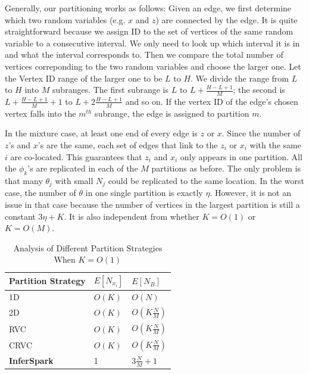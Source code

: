 Generally, our partitioning works as follows: Given an edge, we first determine
which two random variables (e.g. $x$ and $z$) are connected by the edge. It is
quite straightforward because we assign ID to the set of vertices of the same
random variable to a consecutive interval. We only need to look up which
interval it is in and what the interval corresponds to. Then we compare the
total number of vertices correponding to the two random variables and choose
the larger one. Let the Vertex ID range of the larger one to be $L$ to $H$. We
divide the range from $L$ to $H$ into $M$ subranges. The first subrange is $L$
to $L + \frac{H-L+1}{M}$; the second is $L + \frac{H-L+1}{M} + 1$ to $L +
2\frac{H-L+1}{M}$ and so on. If the vertex ID of the edge's chosen vertex falls
into the $m^{th}$ subrange, the edge is assigned to partition $m$.

In the mixture case, at least one end of every edge is $z$ or $x$. Since
the number of $z$'s and $x$'s are the same, 
each set of edges that link to the $z_i$ or $x_i$ with 
the same $i$ are co-located. This guarantees that $z_i$
and $x_i$ only appears in one partition. All the $\phi_k$'s are replicated in each
of the $M$ partitions as before. The only problem is that many $\theta_j$ with
small $N_j$ could be replicated to the same location. In the worst case, the
number of $\theta$ in one single partition is exactly $\eta$. However, it is
not an issue in that case because the number of vertices in the largest
partition is still a constant $3\eta + K$. It is also independent from whether $K
= O(1)$ or $K = O(M)$.


\begin{table}[h]
	\centering
	\caption{Analysis of Different Partition Strategies When $K = O(1)$}
	\label{tab:max_v_per_edge_part_O1}
	\small
	\begin{tabular}{lll}
		\hline
		Partition Strategy & $E[N_{x_i}]$ & $E[N_B]$\\\hline\hline
		1D & $O(K)$ & $O(N)$ \\\hline
		2D & $O(K)$ & $O(K\frac{N}{M})$ \\\hline
		RVC & $O(K)$ & $O(K\frac{N}{M})$ \\\hline
		CRVC & $O(K)$ & $O(K\frac{N}{M})$ \\\hline
		{\bf InferSpark} & 1 & $3\frac{N}{M}+1$ \\\hline
	\end{tabular}
\end{table}

